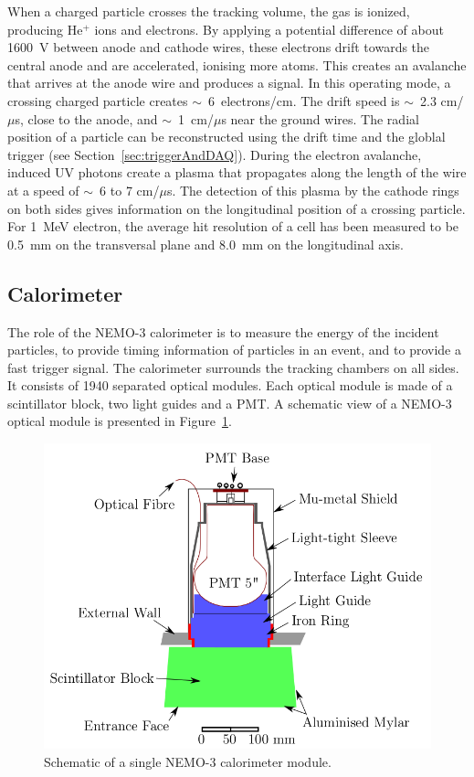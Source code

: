 \documentclass[main.tex]{subfiles}
\begin{document}
\NI When a charged particle crosses the tracking volume, the gas is ionized, producing He$^{+}$ ions and electrons. By applying a potential difference of about 1600~V between anode and cathode wires, these electrons drift towards the central anode and are accelerated, ionising more atoms. This creates an avalanche that arrives at the anode wire and produces a signal. In this operating mode, a crossing charged particle creates $\sim$~6~electrons/cm. The drift speed is $\sim$~2.3 cm/$\mu$s, close to the anode, and $\sim$~1~cm/$\mu$s near the ground wires. The radial position of a particle can be reconstructed using the drift time and the globlal trigger (see Section~\ref{sec:triggerAndDAQ}). During the electron avalanche, induced UV photons create a plasma that propagates along the length of the wire at a speed of $\sim$~6 to 7 cm/$\mu$s. The detection of this plasma by the cathode rings on both sides gives information on the longitudinal position of a crossing particle. For 1~MeV electron, the average hit resolution of a cell has been measured to be 0.5~mm on the transversal plane and 8.0~mm on the longitudinal axis.


\subsection{Calorimeter}


\NI The role of the NEMO-3 calorimeter is to measure the energy of the incident particles, to provide timing information of particles in an event, and to provide a fast trigger signal. The calorimeter surrounds the tracking chambers on all sides. It consists of 1940 separated optical modules. Each optical module is made of a scintillator block, two light guides and a PMT. A schematic view of a NEMO-3 optical module is presented in Figure~\ref{CaloModuleNEMO3}.	


\bigskip

\begin{figure}[h!]
\begin{center}
\includegraphics[scale=0.40]{pictures/Chap3/CaloModuleNEMO3.png}
\caption{Schematic of a single NEMO-3 calorimeter module.}
\label{CaloModuleNEMO3}
\end{center}
\end{figure}
\end{document}
